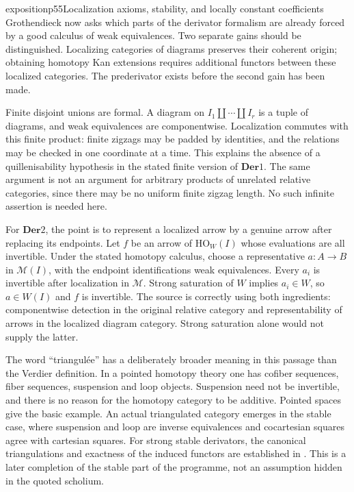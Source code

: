 \begin{dcomment}{exposition}{p55}{Localization axioms, stability, and locally constant coefficients}
Grothendieck now asks which parts of the derivator formalism are already forced by a good calculus of weak equivalences. Two separate gains should be distinguished. Localizing categories of diagrams preserves their coherent origin; obtaining homotopy Kan extensions requires additional functors between these localized categories. The prederivator exists before the second gain has been made.

Finite disjoint unions are formal. A diagram on $I_1\amalg\cdots\amalg I_r$ is a tuple of diagrams, and weak equivalences are componentwise. Localization commutes with this finite product: finite zigzags may be padded by identities, and the relations may be checked in one coordinate at a time. This explains the absence of a quillenisability hypothesis in the stated finite version of $\mathbf{Der}1$. The same argument is not an argument for arbitrary products of unrelated relative categories, since there may be no uniform finite zigzag length. No such infinite assertion is needed here.

For $\mathbf{Der}2$, the point is to represent a localized arrow by a genuine arrow after replacing its endpoints. Let $f$ be an arrow of $\mathrm{HO}_W(I)$ whose evaluations are all invertible. Under the stated homotopy calculus, choose a representative $a:A\to B$ in $\mathcal M(I)$, with the endpoint identifications weak equivalences. Every $a_i$ is invertible after localization in $\mathcal M$. Strong saturation of $W$ implies $a_i\in W$, so $a\in W(I)$ and $f$ is invertible. The source is correctly using both ingredients: componentwise detection in the original relative category and representability of arrows in the localized diagram category. Strong saturation alone would not supply the latter.

The word ``triangulée'' has a deliberately broader meaning in this passage than the Verdier definition. In a pointed homotopy theory one has cofiber sequences, fiber sequences, suspension and loop objects. Suspension need not be invertible, and there is no reason for the homotopy category to be additive. Pointed spaces give the basic example. An actual triangulated category emerges in the stable case, where suspension and loop are inverse equivalences and cocartesian squares agree with cartesian squares. For strong stable derivators, the canonical triangulations and exactness of the induced functors are established in \citet[Theorem 4.16 and Proposition 4.18]{Groth2013}. This is a later completion of the stable part of the programme, not an assumption hidden in the quoted scholium.


\end{dcomment}
